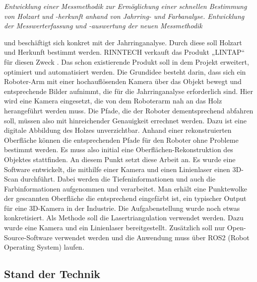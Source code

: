 	\textit{\glqq Entwicklung einer Messmethodik zur Ermöglichung einer schnellen Bestimmung von Holzart und -herkunft anhand von Jahrring- und Farbanalyse. Entwicklung der Messwerterfassung und -auswertung der neuen Messmethodik\grqq}
	
	und beschäftigt sich konkret mit der Jahrringanalyse. Durch diese soll Holzart und Herkunft bestimmt werden. RINNTECH verkauft das Produkt „LINTAP“ für diesen Zweck \citep[Vgl.][Produkte]{noauthor_rinntech_nodate}. Das schon existierende Produkt soll in dem Projekt erweitert, optimiert und automatisiert werden. Die Grundidee besteht darin, dass sich ein Roboter-Arm mit einer hochauflösenden Kamera über das Objekt bewegt und entsprechende Bilder aufnimmt, die für die Jahrringanalyse erforderlich sind. Hier wird eine Kamera eingesetzt, die von dem Roboterarm nah an das Holz herangeführt werden muss. Die Pfade, die der Roboter dementsprechend abfahren soll, müssen also mit hinreichender Genauigkeit errechnet werden. Dazu ist eine digitale Abbildung des Holzes unverzichtbar. Anhand einer rekonstruierten Oberfläche können die entsprechenden Pfade für den Roboter ohne Probleme bestimmt werden. Es muss also initial eine Oberflächen-Rekonstruktion des Objektes stattfinden. An diesem Punkt setzt diese Arbeit an. Es wurde eine Software entwickelt, die mithilfe einer Kamera und einen Linienlaser einen 3D-Scan durchführt. Dabei werden die Tiefeninformationen und auch die Farbinformationen aufgenommen und verarbeitet. Man erhält eine Punktewolke der gescannten Oberfläche die entsprechend eingefärbt ist, ein typischer Output für eine 3D-Kamera in der Industrie. Die Aufgabenstellung wurde noch etwas konkretisiert. Als Methode soll die Lasertriangulation verwendet werden. Dazu wurde eine Kamera und ein Linienlaser bereitgestellt. Zusätzlich soll nur Open-Source-Software verwendet werden und die Anwendung muss über ROS2 (Robot Operating System) laufen.
	
	\subsection{Stand der Technik}
